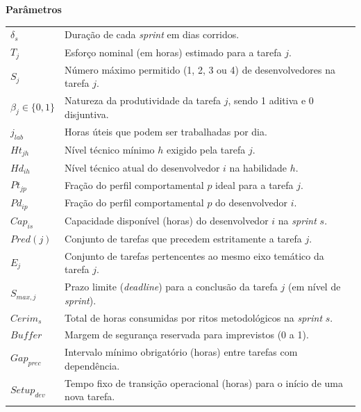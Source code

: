 \documentclass[a4paper,11pt]{article}
\begin{document}
\vspace{0.3cm}
\noindent\textbf{Parâmetros}
\begin{center}
    \begin{tabular}{p{2.5cm} p{12cm}}
        $\delta_s$ & Duração de cada \textit{sprint} em dias corridos. \\
        $T_j$ & Esforço nominal (em horas) estimado para a tarefa $j$. \\
        $S_j$ & Número máximo permitido (1, 2, 3 ou 4) de desenvolvedores na tarefa $j$. \\
        $\beta_j \in \{0, 1\}$ & Natureza da produtividade da tarefa $j$, 
        sendo 1 aditiva e 0 disjuntiva. \\
        $j_{lab}$ & Horas úteis que podem ser trabalhadas por dia. \\
        $Ht_{jh}$ & Nível técnico mínimo $h$ exigido pela tarefa $j$. \\
        $Hd_{ih}$ & Nível técnico atual do desenvolvedor $i$ na habilidade $h$. \\
        $Pt_{jp}$ & Fração do perfil comportamental $p$ ideal para a tarefa $j$. \\
        $Pd_{ip}$ & Fração do perfil comportamental $p$ do desenvolvedor $i$. \\
        $Cap_{is}$ & Capacidade disponível (horas) do desenvolvedor $i$ 
        na \textit{sprint} $s$. \\
        $Pred(j)$ & Conjunto de tarefas que precedem estritamente a tarefa $j$. \\
        $E_j$ & Conjunto de tarefas pertencentes ao mesmo eixo temático da tarefa $j$. \\
        $S_{max, j}$ & Prazo limite (\textit{deadline}) para a conclusão da tarefa $j$ 
        (em nível de \textit{sprint}). \\
        $Cerim_{s}$ & Total de horas consumidas por ritos metodológicos 
        na \textit{sprint} $s$. \\
        $Buffer$ & Margem de segurança reservada para imprevistos (0 a 1). \\
        $Gap_{prec}$ & Intervalo mínimo obrigatório (horas) entre tarefas 
        com dependência. \\
        $Setup_{dev}$ & Tempo fixo de transição operacional (horas) para o 
        início de uma nova tarefa. \\
    \end{tabular}
\end{center}
\end{document}
